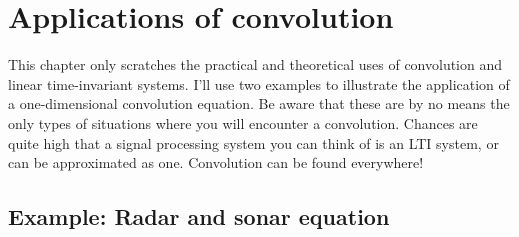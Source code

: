\section{Applications of convolution}

This chapter only scratches the practical and theoretical uses of
convolution and linear time-invariant systems. I'll use two examples
to illustrate the application of a one-dimensional convolution
equation. Be aware that these are by no means the only types of
situations where you will encounter a convolution. Chances are quite
high that a signal processing system you can think of is an LTI
system, or can be approximated as one. Convolution can be found
everywhere!

\subsection{Example: Radar and sonar equation}

